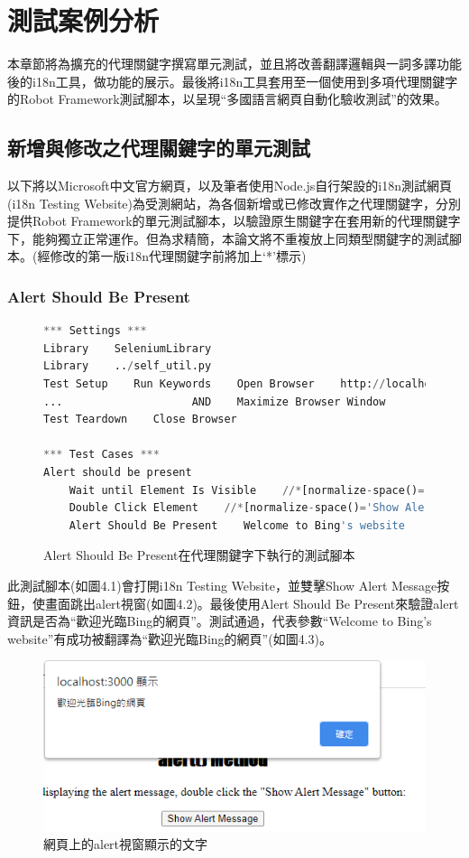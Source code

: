 \chapter{測試案例分析}
本章節將為擴充的代理關鍵字撰寫單元測試\cite{ut}，並且將改善翻譯邏輯與一詞多譯功能後的i18n工具，做功能的展示。最後將i18n工具套用至一個使用到多項代理關鍵字的Robot Framework測試腳本，以呈現“多國語言網頁自動化驗收測試”的效果。

\section{新增與修改之代理關鍵字的單元測試}
以下將以Microsoft中文官方網頁\cite{microsoft}，以及筆者使用Node.js\cite{nodejs}自行架設的i18n測試網頁(i18n Testing Website)為受測網站，為各個新增或已修改實作之代理關鍵字，分別提供Robot Framework的單元測試腳本，以驗證原生關鍵字在套用新的代理關鍵字下，能夠獨立正常運作。但為求精簡，本論文將不重複放上同類型關鍵字的測試腳本。(經修改的第一版i18n代理關鍵字前將加上‘*’標示)

\subsection{Alert Should Be Present}
\begin{figure}[H]
\begin{lstlisting}[language={python}]
*** Settings ***
Library    SeleniumLibrary
Library    ../self_util.py
Test Setup    Run Keywords    Open Browser    http://localhost:3000    Chrome
...                    AND    Maximize Browser Window
Test Teardown    Close Browser

*** Test Cases ***
Alert should be present
    Wait until Element Is Visible    //*[normalize-space()='Show Alert Message']    timeout=${shortPeriodOfTime}
    Double Click Element    //*[normalize-space()='Show Alert Message']
    Alert Should Be Present    Welcome to Bing's website
\end{lstlisting}
\caption{Alert Should Be Present在代理關鍵字下執行的測試腳本}
\end{figure}
此測試腳本(如圖4.1)會打開i18n Testing Website，並雙擊Show Alert Message按鈕，使畫面跳出alert視窗(如圖4.2)。最後使用Alert Should Be Present來驗證alert資訊是否為“歡迎光臨Bing的網頁”。測試通過，代表參數“Welcome to Bing’s website”有成功被翻譯為“歡迎光臨Bing的網頁”(如圖4.3)。

\begin{figure}[H]
\includegraphics[width= \textwidth]{../論文截圖/4-1-2 alert視窗的文字.png}
\caption{網頁上的alert視窗顯示的文字}
\end{figure}

